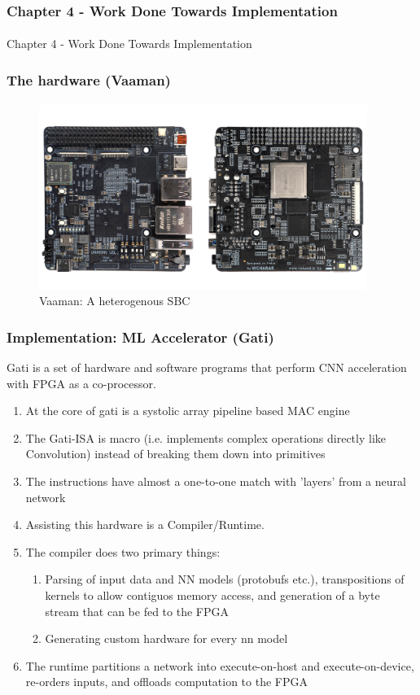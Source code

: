 \documentclass{beamer}
\begin{document}
\begin{frame}[fragile]
  \frametitle{Chapter 4 - Work Done Towards Implementation}
  \framesubtitle{}
  Chapter 4 - Work Done Towards Implementation
\end{frame}

\begin{frame}[fragile]
  \frametitle{The hardware (Vaaman)}
  \framesubtitle{}
  \begin{figure}
    \centering
    \includegraphics[width=0.95\textwidth]{vaaman.jpg}
    \caption{Vaaman: A heterogenous SBC}
    \label{neuron}
  \end{figure}
\end{frame}

\begin{frame}[fragile]
  \frametitle{Implementation: ML Accelerator (Gati)}
  Gati is a set of hardware and software programs that perform CNN
  acceleration with FPGA as a co-processor.
  \begin{enumerate}
    \item At the core of gati is a systolic array pipeline based MAC engine
    \item The Gati-ISA is macro (i.e. implements complex operations directly
      like Convolution) instead of breaking them down into primitives
    \item The instructions have almost a one-to-one match with 'layers'
      from a neural network
    \item Assisting this hardware is a Compiler/Runtime.
    \item The compiler does two primary things:
      \begin{enumerate}
        \item Parsing of input data and NN models (protobufs etc.),
          transpositions of kernels to allow contiguos memory access, and generation
          of a byte stream that can be fed to the FPGA
        \item Generating custom hardware for every nn model
      \end{enumerate}
    \item The runtime partitions a network into execute-on-host and
      execute-on-device, re-orders inputs, and offloads computation
      to the FPGA
  \end{enumerate}
\end{frame}
\end{document}
